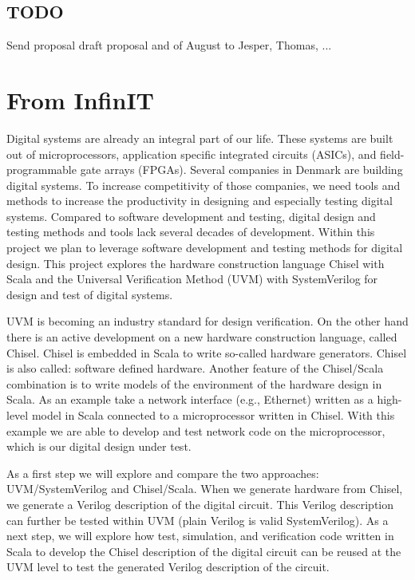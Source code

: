 \documentclass[fleqn,12pt]{article}
\begin{document}
\subsection{TODO}

Send proposal draft proposal and of August to Jesper, Thomas, ...

\section{From InfinIT}

Digital systems are already an integral part of our life. These systems are built out of microprocessors, application specific integrated circuits (ASICs), and field-programmable gate arrays (FPGAs). Several companies in Denmark are building digital systems. To increase competitivity of those companies, we need tools and methods to increase the productivity in designing and especially testing digital systems. Compared to software development and testing, digital design and testing methods and tools lack several decades of development. Within this project we plan to leverage software development and testing methods for digital design. This project explores the hardware construction language Chisel with Scala and the Universal Verification Method (UVM) with SystemVerilog for design and test of digital systems.



UVM is becoming an industry standard for design verification. On the other hand there is an active development on a new hardware construction language, called Chisel. Chisel is embedded in Scala to write so-called hardware generators. Chisel is also called: software defined hardware. Another feature of the Chisel/Scala combination is to write models of the environment of the hardware design in Scala. As an example take a network interface (e.g., Ethernet) written as a high-level model in Scala connected to a microprocessor written in Chisel. With this example we are able to develop and test network code on the microprocessor, which is our digital design under test.



As a first step we will explore and compare the two approaches: UVM/SystemVerilog and Chisel/Scala. When we generate hardware from Chisel, we generate a Verilog description of the digital circuit. This Verilog description can further be tested within UVM (plain Verilog is valid SystemVerilog). As a next step, we will explore how test, simulation, and verification code written in Scala to develop the Chisel description of the digital circuit can be reused at the UVM level to test the generated Verilog description of the circuit.
\end{document}
